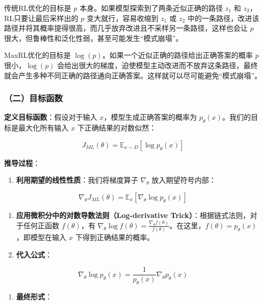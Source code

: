 传统RL优化的目标是 \(p\) 本身。如果模型探索到了两条近似正确的路径 \(z_1\) 和 \(z_2\)，RL只要让最后采样出的 \(p\) 变大就行，容易收缩到 \(z_1\) 或 \(z_2\) 中的一条路径，改进该路径并将其概率提得很高，而几乎放弃改进且不采样另一条路径，这样也会让 \(p\) 很大，但鲁棒性和泛化性弱，甚至可能发生``模式崩塌''。

MaxRL优化的目标是 \(\log(p)\)。如果一个近似正确的路径给出正确答案的概率 \(p\) 很小，\(\log(p)\) 会给出很大的梯度，迫使模型主动改进而不放弃这条路径，最终就会产生多种不同正确的路径通向正确答案。这样就可以尽可能避免``模式崩塌''。

\hypertarget{ux4e8cux76eeux6807ux51fdux6570-1}{%
\subsubsection{（二）目标函数}\label{ux4e8cux76eeux6807ux51fdux6570-1}}

\textbf{定义目标函数}：假设对于输入 \(x\)，模型生成正确答案的概率为 \(p_\theta(x)\)。我们的目标是最大化所有输入 \(x\) 下正确结果的对数似然：

\[
J_{ML}(\theta)=\mathbb{E}_{x\sim D}[\log p_\theta(x)]
\]

\textbf{推导过程}：

\begin{enumerate}
\def\labelenumi{\arabic{enumi}.}
\tightlist
\item
  \textbf{利用期望的线性性质}：我们将梯度算子 \(\nabla_\theta\) 放入期望符号内部：
\end{enumerate}

\[
\nabla_\theta J_{ML}(\theta)=\mathbb{E}_x[\nabla_\theta \log p_\theta(x)]
\]

\begin{enumerate}
\def\labelenumi{\arabic{enumi}.}
\setcounter{enumi}{1}
\item
  \textbf{应用微积分中的对数导数法则（Log-derivative Trick）}：根据链式法则，对于任何正函数 \(f(\theta)\)，有 \(\nabla_\theta \log f(\theta)=\frac{\nabla_\theta f(\theta)}{f(\theta)}\)。在这里，\(f(\theta)=p_\theta(x)\)，即模型在输入 \(x\) 下得到正确结果的概率。
\item
  \textbf{代入公式}：
\end{enumerate}

\[
\nabla_\theta \log p_\theta(x)=\frac{1}{p_\theta(x)}\nabla_\theta p_\theta(x)
\]

\begin{enumerate}
\def\labelenumi{\arabic{enumi}.}
\setcounter{enumi}{3}
\tightlist
\item
  \textbf{最终形式}：
\end{enumerate}

